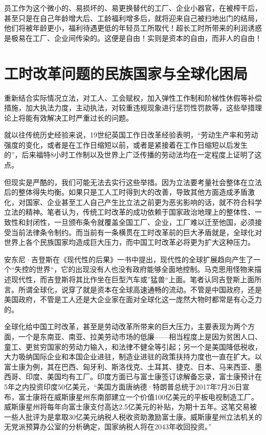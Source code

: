 员工作为这个微小的、易损坏的、易更换替代的工厂、企业小器官，在被榨干后，甚至只是在自己年龄增大后、工龄福利增多后，就将迎来自己被扫地出门的结局，他们将被年龄更小，福利待遇更低的年轻员工所取代！超长工时所带来的利润诱惑是极易在工厂、企业间传染的。这便是自由！实则是资本的自由，而非人的自由！

\section{工时改革问题的民族国家与全球化困局}

重新结合实际情况立法，对工人、工会赋权，加入弹性工作制和阶梯性休假等补偿措施，加大执法力度，主动执法，对较重违规现象进行惩罚性罚款等，这些举措理论上将能有效解决工时严重过长的问题。

就以往传统历史经验来说，19世纪英国工作日改革经验表明，“劳动生产率和劳动强度的变化，或者是在工作日缩短以前，或者是紧接着在工作日缩短以后发生的”，后来福特8小时工作制以及世界上广泛传播的劳动法均在一定程度上证明了这点。

但现实是严酷的，我们可能无法去实行这些举措。因为立法要考量社会整体在立法后的整体得失均衡。如果只是工人工时得到大的改善，导致其他方面造成矛盾激化，对国家、企业甚至工人自己产生比立法之前更为恶劣影响的话，就不符合科学立法的精神。笔者认为，传统工时改革的成功依赖于国家政治地理上的整体性、一致性和封闭性，一旦颁布条令就覆盖全国工厂、企业，工厂难以迁至他国，必须接受当前法律条令制约。而当前有一条横贯在工时改革前的巨大矛盾就是，全球化对世界上各个民族国家均造成巨大压力，而中国工时改革必将更为扩大这种压力。

安东尼·吉登斯在《现代性的后果》一书中提出，现代性的全球扩展趋向产生了一个“失控的世界“，它的出现没有人也没有政府能够全面地控制。马克思用怪物来描述现代性，而吉登斯将其比作坐在巨型汽车或”猛兽“上面。笔者认同吉登斯上面所言。所谓全球化，说穿了就是资本在全球高速通畅的流动。不管是中国政府，还是美国政府，不管是工人还是大企业家在面对全球化这一庞然大物时都常是有心乏力的。

全球化给中国工时改革，甚至是劳动改革所带来的巨大压力，主要表现为两个方面，一个是东南亚、南亚、拉美劳动市场的低廉——相当程度上是因为贫困人口、童工、更贫穷国家的劳动力输入，和法律不健全等引起；另一个是美国降低税收，大力吸纳国际企业和本国企业进驻，制造业进驻的政策扶持力度也一直在扩大。以富士康\cite{foxconnwiki}为例，其在巴西、匈牙利、斯洛伐克、土耳其、捷克、日本、马来西亚、墨西哥、印度、美国均有工厂。印度方面已与富士康签订谅解备忘录，富士康预计在5年之内投资印度50亿美元，“美国方面唐纳德·特朗普总统于2017年7月26日宣布，富士康将在威斯康星州东南部建立一个价值100亿美元的平板电视制造工厂。威斯康星州将每年向富士康支付高达2.5亿美元的补贴，为期十五年。这笔交易被一些人批评为是拿取30亿美元纳税人税收资助激励富士康。威斯康星州立法机关的无党派预算办公室的分析确定，国家纳税人将在2043年收回投资。”

